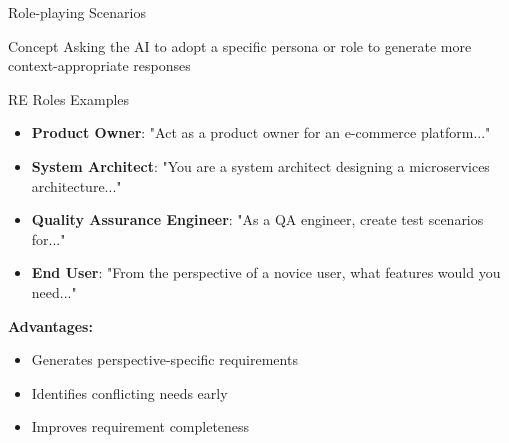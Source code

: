 \documentclass{beamer}
\begin{document}
\begin{frame}[t]{Role-playing Scenarios}
    \begin{block}{Concept}
        Asking the AI to adopt a specific persona or role to generate more context-appropriate responses
    \end{block}
    
    \begin{exampleblock}{RE Roles Examples}
        \begin{itemize}
            \scriptsize
            \item \textbf{Product Owner}: "Act as a product owner for an e-commerce platform..."
            \item \textbf{System Architect}: "You are a system architect designing a microservices architecture..."
            \item \textbf{Quality Assurance Engineer}: "As a QA engineer, create test scenarios for..."
            \item \textbf{End User}: "From the perspective of a novice user, what features would you need..."
        \end{itemize}
    \end{exampleblock}
    
    \textbf{Advantages:}
    \begin{itemize}
        \item Generates perspective-specific requirements
        \item Identifies conflicting needs early
        \item Improves requirement completeness
    \end{itemize}
\end{frame}
\end{document}
